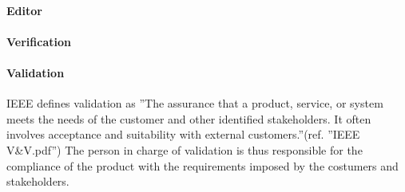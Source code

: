\paragraph{Editor}

\paragraph{Verification}

\paragraph{Validation}
IEEE defines validation as ''The assurance that a product, service, or system meets the needs of the customer and other identified stakeholders. It often involves acceptance and suitability with external customers.''(ref. ''IEEE V\&V.pdf'') The person in charge of validation is thus responsible for the compliance of the product with the requirements imposed by the costumers and stakeholders. 